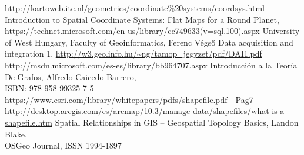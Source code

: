 \begin{thebibliography}{99}
	 \url{http://kartoweb.itc.nl/geometrics/coordinate%20systems/coordsys.html}
	 Introduction to Spatial Coordinate Systems: Flat Maps for a Round Planet,\\ \url{https://technet.microsoft.com/en-us/library/cc749633(v=sql.100).aspx}
	 University of West Hungary, Faculty of Geoinformatics, Ferenc Végső
Data acquisition and integration 1. \url{http://w3.geo.info.hu/~ng/tamop_jegyzet/pdf/DAI1.pdf}
	 http://msdn.microsoft.com/es-es/library/bb964707.aspx
	 Introducción a la Teoría De Grafos, Alfredo Caicedo Barrero, \\ISBN: 978-958-99325-7-5
	 https://www.esri.com/library/whitepapers/pdfs/shapefile.pdf - Pag7
	 \url{http://desktop.arcgis.com/es/arcmap/10.3/manage-data/shapefiles/what-is-a-shapefile.htm}
	 Spatial Relationships in GIS – Geospatial Topology Basics, Landon Blake, \\OSGeo Journal, ISSN 1994-1897

\end{thebibliography}
